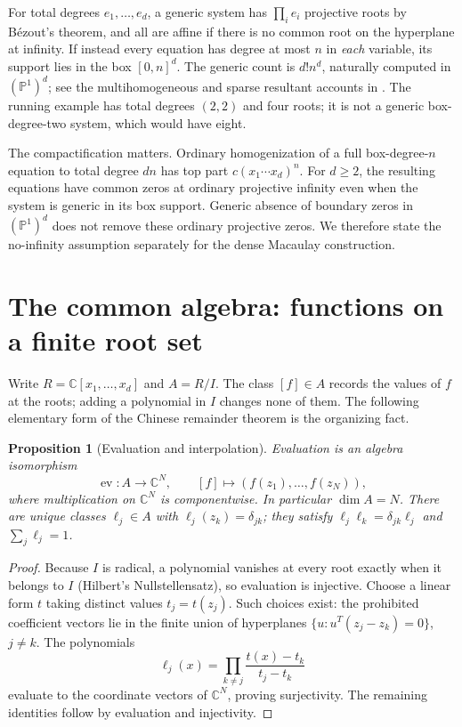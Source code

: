 \documentclass[12pt]{article}
\def\C{\mathbb{C}}
\newtheorem{proposition}[theorem]{Proposition}
\theoremstyle{definition}
\theoremstyle{remark}
\begin{document}
For total degrees $e_1,\ldots,e_d$, a generic system has $\prod_i e_i$ projective
roots by B\'ezout's theorem, and all are affine if there is no common root on the
hyperplane at infinity. If instead every equation has degree at most $n$ in
\emph{each} variable, its support lies in the box $[0,n]^d$. The generic count is
$d!n^d$, naturally computed in $(\mathbb P^1)^d$; see the multihomogeneous and sparse
resultant accounts in \cite{cox2005using,gelfand1994discriminants}. The running example
has total degrees $(2,2)$ and four roots; it is not a generic box-degree-two system,
which would have eight.

The compactification matters. Ordinary homogenization of a full box-degree-$n$ equation
to total degree $dn$ has top part $c(x_1\cdots x_d)^n$. For $d\ge2$, the resulting
equations have common zeros at ordinary projective infinity even when the system is
generic in its box support. Generic absence of boundary zeros in $(\mathbb P^1)^d$
does not remove these ordinary projective zeros. We therefore state the no-infinity
assumption separately for the dense Macaulay construction.

\section{The common algebra: functions on a finite root set}\label{sec:algebra}

Write $R=\C[x_1,\ldots,x_d]$ and $A=R/I$. The class $[f]\in A$ records the values
of $f$ at the roots; adding a polynomial in $I$ changes none of them. The following
elementary form of the Chinese remainder theorem is the organizing fact.

\begin{proposition}[Evaluation and interpolation]\label{prop:evaluation}
Evaluation is an algebra isomorphism
\[
  \operatorname{ev}:A\longrightarrow\C^N,\qquad
  [f]\longmapsto(f(z_1),\ldots,f(z_N)),
\]
where multiplication on $\C^N$ is componentwise. In particular $\dim A=N$.
There are unique classes $\ell_j\in A$ with $\ell_j(z_k)=\delta_{jk}$;
they satisfy $\ell_j\ell_k=\delta_{jk}\ell_j$ and $\sum_j\ell_j=1$.
\end{proposition}

\begin{proof}
Because $I$ is radical, a polynomial vanishes at every root exactly when it belongs
to $I$ (Hilbert's Nullstellensatz), so evaluation is injective.
Choose a linear form $t$ taking distinct values $t_j=t(z_j)$. Such choices exist:
the prohibited coefficient vectors lie in the finite union of hyperplanes
$\{u:u^T(z_j-z_k)=0\}$, $j\ne k$. The polynomials
\[
  \ell_j(x)=\prod_{k\ne j}\frac{t(x)-t_k}{t_j-t_k}
\]
evaluate to the coordinate vectors of $\C^N$, proving surjectivity. The remaining
identities follow by evaluation and injectivity.
\end{proof}
\end{document}
